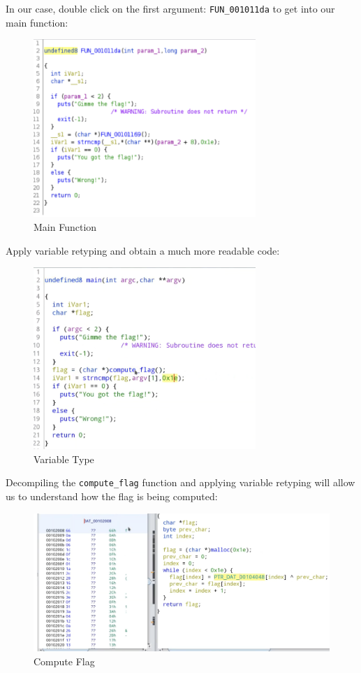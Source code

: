 \documentclass{article}
\begin{document}
\pagebreak
\noindent\linebreak
In our case, double click on the first argument: \texttt{FUN\_001011da} to get into our main function:
\begin{figure}[H]
\centering
\includegraphics[width=0.75\textwidth]{img/ghidra_4.pdf}
\caption{Main Function}
\label{fig:ghidra_4}
\end{figure}

\noindent
Apply variable retyping and obtain a much more readable code:
\begin{figure}[H]
\centering
\includegraphics[width=0.75\textwidth]{img/ghidra_5.pdf}
\caption{Variable Type}
\label{fig:ghidra_5}
\end{figure}

\noindent\linebreak
Decompiling the \texttt{compute\_flag} function and applying variable retyping will allow us to understand how
the flag is being computed:
\begin{figure}[H]
\centering
\includegraphics[width=1\textwidth]{img/ghidra_6.pdf}
\caption{Compute Flag}
\label{fig:ghidra_6}
\end{figure}
\end{document}
